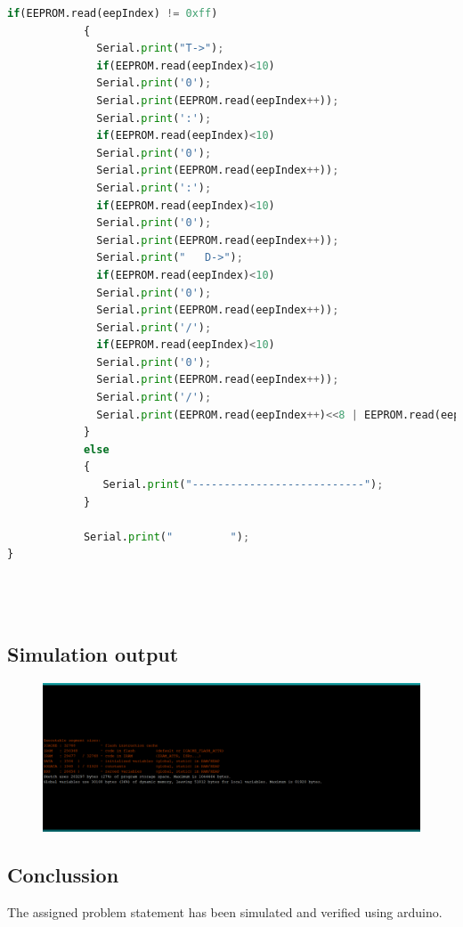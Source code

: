 \documentclass[40pt]{report}
\begin{document}
\begin{itemize}
\begin{lstlisting}[language=python ,frame= single]
            if(EEPROM.read(eepIndex) != 0xff)
            {
              Serial.print("T->");
              if(EEPROM.read(eepIndex)<10)
              Serial.print('0');
              Serial.print(EEPROM.read(eepIndex++));
              Serial.print(':');  
              if(EEPROM.read(eepIndex)<10)
              Serial.print('0');
              Serial.print(EEPROM.read(eepIndex++));
              Serial.print(':'); 
              if(EEPROM.read(eepIndex)<10)
              Serial.print('0');
              Serial.print(EEPROM.read(eepIndex++));
              Serial.print("   D->");
              if(EEPROM.read(eepIndex)<10)
              Serial.print('0');
              Serial.print(EEPROM.read(eepIndex++));
              Serial.print('/');
              if(EEPROM.read(eepIndex)<10)
              Serial.print('0');           
              Serial.print(EEPROM.read(eepIndex++));
              Serial.print('/');            
              Serial.print(EEPROM.read(eepIndex++)<<8 | EEPROM.read(eepIndex++));
            }
            else
            {
               Serial.print("---------------------------");
            }

            Serial.print("         ");
}


 
\end{lstlisting}

\subsection{Simulation output}
 
\begin{figure}[h]
\centering
\includegraphics[scale=0.4]{fg.png}
 
\label{Simulation output}
\end{figure}
\subsection{Conclussion}
\label{conc}
The assigned problem statement has been simulated and verified using arduino.


\end{itemize}
\end{document}
